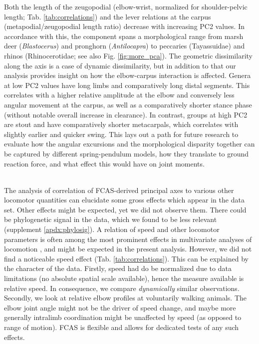 Both the length of the zeugopodial (elbow-wrist, normalized for shoulder-pelvic length; Tab. \ref{tab:correlations}) and the lever relations at the carpus (metapodial/zeugopodial length ratio) decrease with increasing PC2 values.
In accordance with this, the component spans a morphological range from marsh deer (\textit{Blastocerus}) and pronghorn (\textit{Antilocapra}) to peccaries (Tayassuidae) and rhinos (Rhinocerotidae; see also Fig. \ref*{fig:more_pca}).
The geometric dissimilarity along the axis is a case of dynamic dissimilarity, but in addition to that our analysis provides insight on how the elbow-carpus interaction is affected.
Genera at low PC2 values have long limbs and comparatively long distal segments.
This correlates with a higher relative amplitude at the elbow and conversely less angular movement at the carpus, as well as a comparatively shorter stance phase (without notable overall increase in clearance).
In contrast, groups at high PC2 are stout and have comparatively shorter metacarpals, which correlates with slightly earlier and quicker swing.
This lays out a path for future research to evaluate how the angular excursions and the morphological disparity together can be captured by different spring-pendulum models, how they translate to ground reaction force, and what effect this would have on joint moments.
\begin{change}
\\The analysis of correlation of FCAS-derived principal axes to various other locomotor quantities can elucidate some gross effects which appear in the data set.
Other effects might be expected, yet we did not observe them.
There could be phylogenetic signal in the data, which we found to be less relevant (supplement \ref*{apdx:phylosig}).
A relation of speed and other locomotor parameters is often among the most prominent effects in multivariate analyses of locomotion \citep{Druelle2021,Kirtley1985,Fukuchi2019,Schwartz2008}, and might be expected in the present analysis.
However, we did not find a noticeable speed effect (Tab. \ref{tab:correlations}).
This can be explained by the character of the data.
Firstly, speed had do be normalized due to data limitations (no absolute spatial scale available), hence the measure available is relative speed.
In consequence, we compare \textit{dynamically} similar observations.
Secondly, we look at relative elbow profiles at voluntarily walking animals.
The elbow joint angle might not be the driver of speed change, and maybe more generally intralimb coordination might be unaffected by speed (as opposed to range of motion).
FCAS is flexible and allows for dedicated tests of any such effects.
\end{change}




